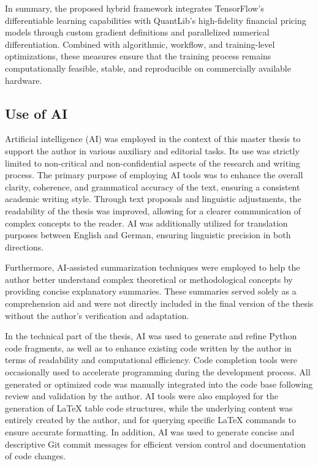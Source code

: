 {In summary, the proposed hybrid framework integrates TensorFlow’s differentiable learning capabilities with QuantLib’s high-fidelity financial pricing models through custom gradient definitions and parallelized numerical differentiation. Combined with algorithmic, workflow, and training-level optimizations, these measures ensure that the training process remains computationally feasible, stable, and reproducible on commercially available hardware.

\subsection{Use of AI}
Artificial intelligence (AI) was employed in the context of this master thesis to support the author in various auxiliary and editorial tasks. Its use was strictly limited to non-critical and non-confidential aspects of the research and writing process. The primary purpose of employing AI tools was to enhance the overall clarity, coherence, and grammatical accuracy of the text, ensuring a consistent academic writing style. Through text proposals and linguistic adjustments, the readability of the thesis was improved, allowing for a clearer communication of complex concepts to the reader. AI was additionally utilized for translation purposes between English and German, ensuring linguistic precision in both directions.

Furthermore, AI-assisted summarization techniques were employed to help the author better understand complex theoretical or methodological concepts by providing concise explanatory summaries. These summaries served solely as a comprehension aid and were not directly included in the final version of the thesis without the author’s verification and adaptation.

In the technical part of the thesis, AI was used to generate and refine Python code fragments, as well as to enhance existing code written by the author in terms of readability and computational efficiency. Code completion tools were occasionally used to accelerate programming during the development process. All generated or optimized code was manually integrated into the code base following review and validation by the author. AI tools were also employed for the generation of LaTeX table code structures, while the underlying content was entirely created by the author, and for querying specific LaTeX commands to ensure accurate formatting. In addition, AI was used to generate concise and descriptive Git commit messages for efficient version control and documentation of code changes.

}
